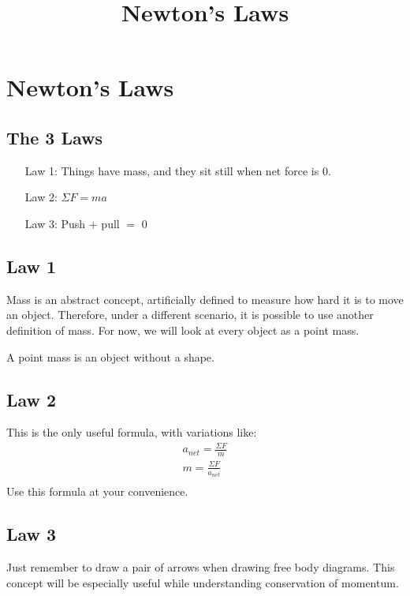 \documentclass[]{article}
\title{Newton's Laws}
\author{}
\begin{document}
\maketitle

\section{Newton's Laws}\label{sec:newton's-laws}

\subsection{The 3 Laws}\label{subsec:the-3-laws}
\begin{enumerate}
		\item[Law 1:] Things have mass, and they sit still when net force is 0. 
		\item[Law 2:] $\Sigma F=ma$
		\item[Law 3:] Push $+$ pull $=$ $0$
	\end{enumerate}
	\subsection{Law 1}
		Mass is an abstract concept, artificially defined to measure how hard it is to move an object.
		Therefore, under a different scenario, it is possible to use another definition of mass.
		For now, we will look at every object as a point mass.
		
		A point mass is an object without a shape.
	\subsection{Law 2}
		This is the only useful formula, with variations like:
		\begin{gather*}
		    a_{net}= \frac{\Sigma F}{m}\\
		    m = \frac{\Sigma F} {a_{net}}\\
		\end{gather*}
		Use this formula at your convenience.
	\subsection{Law 3}
		Just remember to draw a pair of arrows when drawing free body diagrams.
		This concept will be especially useful while understanding conservation of momentum.
\end{document}
